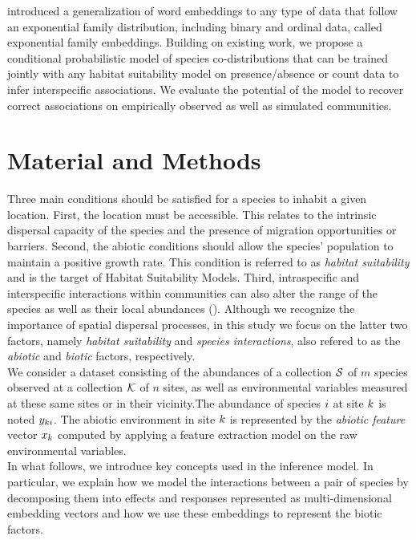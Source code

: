 \documentclass[10pt,a4paper]{article}
\begin{document}
\cite{rudolph2016exponential, liu2017zero} introduced a generalization of word embeddings to any type of data that follow an exponential family distribution, including binary and ordinal data, called exponential family embeddings. Building on existing work, we propose a conditional probabilistic model of species co-distributions that can be trained jointly with any habitat suitability model on presence/absence or count data to infer interspecific associations. We evaluate the potential of the model to recover correct associations on empirically observed as well as simulated communities.

\section{Material and Methods}
Three main conditions should be satisfied for a species to inhabit a given location. First, the location must be accessible. This relates to the intrinsic dispersal capacity of the species and the presence of migration opportunities or barriers.  Second, the abiotic conditions should allow the species' population to maintain a positive growth rate. This condition is referred to as \emph{habitat suitability} and is the target of Habitat Suitability Models. Third, intraspecific and interspecific interactions within communities can also alter the range of the species as well as their local abundances (\cite{guisan2017habitat}). Although we recognize the importance of spatial dispersal processes, in this study we focus on the latter two factors, namely \emph{habitat suitability} and \emph{species interactions}, also refered to as the \emph{abiotic} and \emph{biotic} factors, respectively.\\

We consider a dataset consisting of the abundances of a collection $\mathcal{S}$ of $m$ species observed at a collection $\mathcal{K}$ of $n$ sites, as well as environmental variables measured at these same sites or in their vicinity.The abundance of species $i$ at site $k$ is noted $y_{ki}$. The abiotic environment in site $k$ is represented by the \emph{abiotic feature} vector $x_{k}$ computed by applying a feature extraction model on the raw environmental variables. \\

In what follows, we introduce key concepts used in the inference model. In particular, we explain how we model the interactions between a pair of species by decomposing them into effects and responses represented as multi-dimensional embedding vectors and how we use these embeddings to represent the biotic factors.
\end{document}
